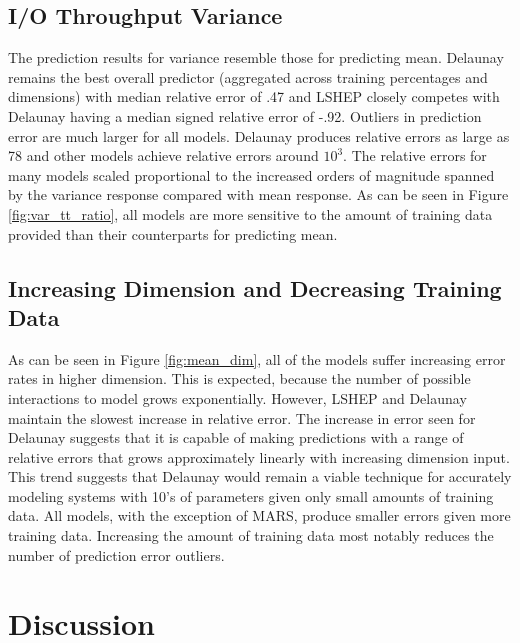 \documentclass{scspaperproc}
\theoremstyle{scsthe}
\begin{document}
\vspace{-10pt}
\subsection{I/O Throughput Variance}
\vspace{-10pt} The prediction results for variance resemble those for
predicting mean. Delaunay remains the best overall predictor
(aggregated across training percentages and dimensions) with median
relative error of .47 and LSHEP closely competes with Delaunay having
a median signed relative error of -.92. Outliers in prediction error
are much larger for all models. Delaunay produces relative errors as
large as 78 and other models achieve relative errors around
$10^3$. The relative errors for many models scaled proportional to the
increased orders of magnitude spanned by the variance response
compared with mean response. As can be seen in Figure
\ref{fig:var_tt_ratio}, all models are more sensitive to the amount of
training data provided than their counterparts for predicting mean.

\vspace{-10pt}
\subsection{Increasing Dimension and Decreasing Training Data}
\vspace{-10pt}
As can be seen in Figure \ref{fig:mean_dim}, all of the models suffer
increasing error rates in higher dimension. This is expected, because
the number of possible interactions to model grows
exponentially. However, LSHEP and Delaunay maintain the slowest
increase in relative error. The increase in error seen for Delaunay
suggests that it is capable of making predictions with a range of
relative errors that grows approximately linearly with increasing
dimension input. This trend suggests that Delaunay would remain a
viable technique for accurately modeling systems with 10's of
parameters given only small amounts of training data. All models, with
the exception of MARS, produce smaller errors given more training
data. Increasing the amount of training data most notably reduces the
number of prediction error outliers.

\section{Discussion}
\label{sec:discussion}
\end{document}
